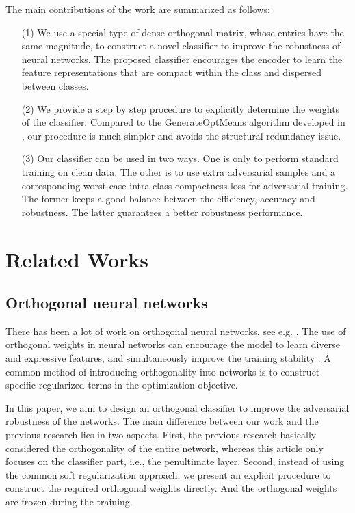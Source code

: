 \documentclass[preprint,review,12pt]{elsarticle}
\numberwithin{equation}{section}
\begin{document}
	
	The main contributions of the work are summarized as follows:	
	\begin{itemize}
		\item [(1)]  We use a special type of dense orthogonal matrix,
                          whose entries have the same magnitude, to construct a novel classifier to improve the  robustness of neural networks.
                          The proposed classifier encourages the encoder to learn the feature representations that are compact within the class and dispersed between classes.


		\item [(2)]  We provide a step by step procedure to explicitly determine the weights of the classifier.
		                  Compared to the GenerateOptMeans algorithm developed in \cite{pang2018,pang2020},
		                  our procedure is much simpler and avoids the structural redundancy issue.


		\item [(3)]  Our classifier can be used in two ways.
                          One is only to perform standard training on clean data.
                          The other is to use extra adversarial samples and a corresponding worst-case  intra-class compactness loss for adversarial training.
					      The former keeps a good balance between the efficiency, accuracy and  robustness.
                          The latter guarantees a better robustness performance.
	\end{itemize}

	
	\section{Related Works}
	
	\subsection{Orthogonal neural networks}
	There has been a lot of work on orthogonal neural networks, see e.g. \cite{bansal2018,huang2018,wang2019,xie2017}.
	The use of orthogonal weights in neural networks can encourage the model to learn diverse and expressive features,
	and simultaneously improve the training stability \cite{bansal2018,wang2019}.
	A common method of introducing orthogonality into networks is to construct specific regularized terms in the optimization objective.

    In this paper, we aim to design an orthogonal classifier to improve the adversarial robustness of the networks.
    The main difference between our work and the previous research lies in two aspects.
    First, the previous research basically considered the orthogonality of the entire network,
    whereas this article only focuses on the classifier part, i.e., the penultimate layer.
    Second,  instead of using the common soft regularization approach,
    we present an explicit procedure to  construct the required orthogonal weights directly.
    And the orthogonal weights are frozen during the training.
\end{document}
